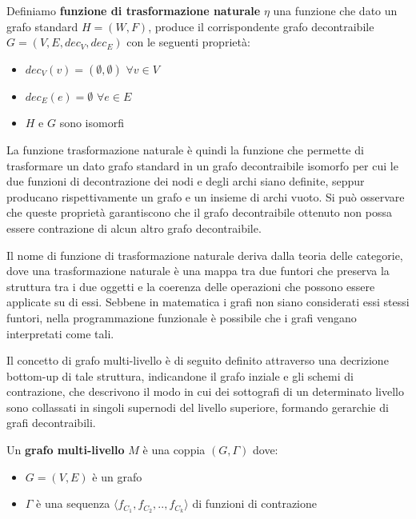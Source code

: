 \begin{definition} 
Definiamo \textbf{funzione di trasformazione naturale} $\eta$ una funzione che dato un grafo standard
    $H=(W,F)$, produce il corrispondente grafo decontraibile $G = (V, E, dec_V, dec_E)$ con le seguenti propriet\`a:
    \begin{itemize}
        \item $dec_V(v) = (\emptyset, \emptyset)$ \quad $\forall v\in V$
        \item $dec_E(e) = \emptyset$ \quad $\forall e\in E$
        \item $H$ e $G$ sono isomorfi
    \end{itemize}
\end{definition}

La funzione trasformazione naturale \`e quindi la funzione che permette di trasformare un dato grafo standard in un
grafo decontraibile isomorfo per cui le due funzioni di decontrazione dei nodi e degli archi siano definite,
seppur producano rispettivamente un grafo e un insieme di archi vuoto. \newline
Si pu\`o osservare che queste propriet\`a garantiscono che il grafo decontraibile ottenuto non possa essere
contrazione di alcun altro grafo decontraibile. \newline

Il nome di funzione di trasformazione naturale deriva dalla teoria delle categorie, dove una trasformazione
naturale \`e una mappa tra due funtori che preserva la struttura tra i due oggetti e la coerenza delle operazioni
che possono essere applicate su di essi. Sebbene in matematica i grafi non siano considerati essi stessi funtori,
nella programmazione funzionale \`e possibile che i grafi vengano interpretati come tali. \newline

\label{subsec:definzione-grafi_multilivello}

Il concetto di grafo multi-livello \`e di seguito definito attraverso una decrizione bottom-up di tale struttura,
indicandone il grafo inziale e gli schemi di contrazione, che descrivono il modo in cui dei sottografi di un
determinato livello sono collassati in singoli supernodi del livello superiore, formando gerarchie di grafi
decontraibili.

\begin{definition}
Un \textbf{grafo multi-livello} $M$ \`e una coppia $(G, \Gamma)$ dove:
    \begin{itemize}
        \item $G = (V, E)$ \`e un grafo
        \item $\Gamma$ \`e una sequenza $\langle f_{C_1}, f_{C_2}, .., f_{C_k} \rangle$ di funzioni di contrazione
    \end{itemize}
\end{definition}


